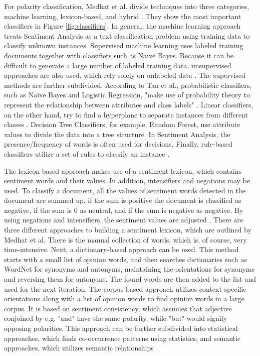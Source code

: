 For polarity classification, Medhat et al. divide techniques into three categories, machine learning, lexicon-based, and hybrid \cite{MEDHAT20141093}. They show the most important classifiers in Figure \ref{fig:classifiers}. In general, the machine learning approach treats Sentiment Analysis as a text classification problem using training data to classify unknown instances. Supervised machine learning uses labeled training documents together with classifiers such as Naive Bayes. Because it can be difficult to generate a large number of labeled training data, unsupervised approaches are also used, which rely solely on unlabeled data \cite{MEDHAT20141093}. The supervised methods are further subdivided. According to Tan et al., probabilistic classifiers, such as Naive Bayes and Logistic Regression, "make use of probability theory to represent the relationship between attributes and class labels" \cite[p.~414]{DBLP:books/aw/TanSKK2019}. Linear classifiers, on the other hand, try to find a hyperplane to separate instances from different classes \cite{MEDHAT20141093}. Decision Tree Classifiers, for example, Random Forest, use attribute values to divide the data into a tree structure. In Sentiment Analysis, the presence/frequency of words is often used for decisions. Finally, rule-based classifiers utilize a set of rules to classify an instance \cite{DBLP:books/aw/TanSKK2019}.

The lexicon-based approach makes use of a sentiment lexicon, which contains sentiment words and their values. In addition, intensifiers and negations may be used. To classify a document, all the values of sentiment words detected in the document are summed up, if the sum is positive the document is classified as negative, if the sum is 0 as neutral, and if the sum is negative as negative. By using negations and intensifiers, the sentiment values are adjusted \cite{liu_2015}. There are three different approaches to building a sentiment lexicon, which are outlined by Medhat et al. There is the manual collection of words, which is, of course, very time-intensive. Next, a dictionary-based approach can be used. This method starts with a small list of opinion words, and then searches dictionaries such as WordNet for synonyms and antonyms, maintaining the orientations for synonyms and reversing them for antonyms. The found words are then added to the list and used for the next iteration. The corpus-based approach utilizes context-specific orientations along with a list of opinion words to find opinion words in a large corpus. It is based on sentiment consistency, which assumes that adjective conjoined by e.g. "and" have the same polarity, while "but" would signify opposing polarities. This approach can be further subdivided into statistical approaches, which finds co-occurrence patterns using statistics, and semantic approaches, which utilizes semantic relationships \cite{MEDHAT20141093}.







